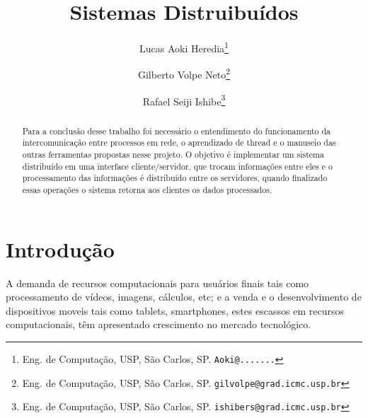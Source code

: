 \documentclass[12pt,a4paper]{article}
\begin{document}
%

\title{Sistemas Distruibuídos}

\author{Lucas Aoki Heredia\thanks{Eng. de Computação, USP, São Carlos, SP. \texttt{Aoki@.......}} \and
Gilberto Volpe Neto\thanks{Eng. de Computação, USP, São Carlos, SP.  \texttt{gilvolpe@grad.icmc.usp.br}} \and
Rafael Seiji Ishibe\thanks{Eng. de Computação, USP, São Carlos, SP.  \texttt{ishibers@grad.icmc.usp.br}}}

\date{}

\maketitle


\newpage
\begin{abstract} 
Para a conclusão desse trabalho foi necessário o entendimento do funcionamento da intercomunicação entre processos em rede, o aprendizado de thread e o manuseio das outras ferramentas propostas nesse projeto.
O objetivo é implementar um sistema distribuído em uma interface cliente/servidor, que trocam informações entre eles e o processamento das informações é distribuído entre os servidores, quando finalizado essas operações o sistema retorna aos clientes os dados processados.
\end{abstract}


\newpage
\section{Introdução}

  A demanda de recursos computacionais para usuários finais tais como processamento de vídeos, imagens, cálculos, etc; e a venda e o desenvolvimento de dispositivos moveis tais como tablets, smartphones, estes escassos em recursos computacionais, têm apresentado crescimento no mercado tecnológico.
\end{document}
